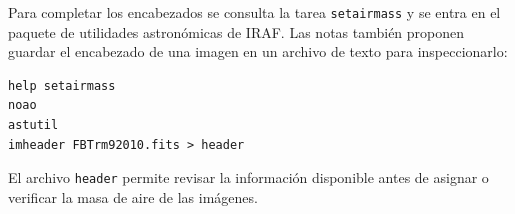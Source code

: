 \documentclass[11pt]{article}
\begin{document}
\begin{center}
  
\end{center}

Para completar los encabezados se consulta la tarea \texttt{setairmass} y se
entra en el paquete de utilidades astronómicas de IRAF. Las notas también
proponen guardar el encabezado de una imagen en un archivo de texto para
inspeccionarlo:

\begin{verbatim}
help setairmass
noao
astutil
imheader FBTrm92010.fits > header
\end{verbatim}

El archivo \texttt{header} permite revisar la información disponible antes de
asignar o verificar la masa de aire de las imágenes.
\end{document}
